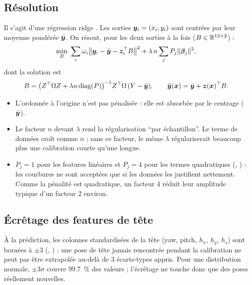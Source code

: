 \subsection{Résolution}

Il s'agit d'une régression ridge \cite{hoerl1970}. Les sorties $\bm{y}_i = (x_i, y_i)$ sont centrées par leur moyenne pondérée $\bar{\bm{y}}$. On résout, pour les deux sorties à la fois ($B \in \mathbb{R}^{13\times2}$) :
\begin{equation}
  \min_{B}\ \sum_i \omega_i \big\|\vect{y}_i - \bar{\vect{y}} - \vect{z}_i\T B\big\|^2 + \lambda\, n \sum_j P_j \|\vect{\beta}_j\|^2,
\end{equation}
dont la solution est
\begin{equation}
  B = \big(Z^{\top} \Omega Z + \lambda n \operatorname{diag}(P)\big)^{-1} Z^{\top} \Omega\, (Y - \bar{\bm{y}}),
  \qquad \hat{\bm{y}}(\bm{x}) = \bar{\bm{y}} + \bm{z}(\bm{x})^{\top} B .
\end{equation}

\begin{itemize}
  \item L'ordonnée à l'origine n'est pas pénalisée : elle est absorbée par le centrage ($\bar{\bm{y}}$).
  \item Le facteur $n$ devant $\lambda$ rend la régularisation \enquote{par échantillon}. Le terme de données croît comme $n$ ; sans ce facteur, le même $\lambda$ régulariserait beaucoup plus une calibration courte qu'une longue.
  \item $P_j = 1$ pour les features linéaires et $P_j = 4$ pour les termes quadratiques (, \empi) : les courbures ne sont acceptées que si les données les justifient nettement. Comme la pénalité est quadratique, un facteur 4 réduit leur amplitude typique d'un facteur 2 environ.
\end{itemize}

\subsection{Écrêtage des features de tête}

À la prédiction, les colonnes standardisées de la tête (yaw, pitch, $h_x$, $h_y$, $h_s$) sont bornées à $\pm3$ (, \deriv) : une pose de tête jamais rencontrée pendant la calibration ne peut pas être extrapolée au-delà de 3 écarts-types appris. Pour une distribution normale, $\pm3\sigma$ couvre \qty{99.7}{\percent} des valeurs ; l'écrêtage ne touche donc que des poses réellement nouvelles.

